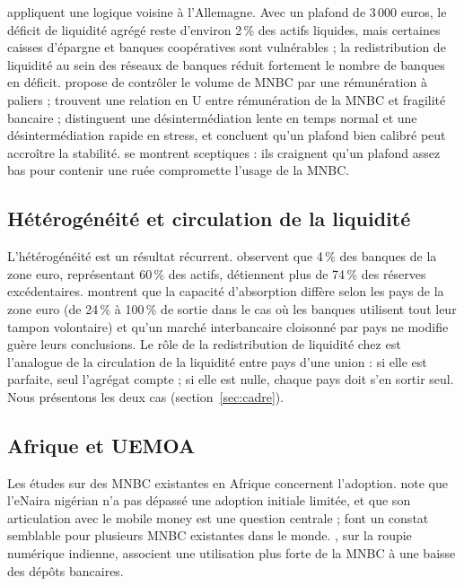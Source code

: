 \documentclass[11pt,a4paper]{article}
\begin{document}
	\citet{fritz2024} appliquent une logique voisine à l'Allemagne. Avec un plafond de 3\,000 euros, le déficit de liquidité agrégé reste d'environ 2\,\% des actifs liquides, mais certaines caisses d'épargne et banques coopératives sont vulnérables ; la redistribution de liquidité au sein des réseaux de banques réduit fortement le nombre de banques en déficit. \citet{bindseil2020} propose de contrôler le volume de MNBC par une rémunération à paliers ; \citet{ahnert2023} trouvent une relation en U entre rémunération de la MNBC et fragilité bancaire ; \citet{bidder2024} distinguent une désintermédiation lente en temps normal et une désintermédiation rapide en stress, et concluent qu'un plafond bien calibré peut accroître la stabilité. \citet{kumhof2018} se montrent sceptiques : ils craignent qu'un plafond assez bas pour contenir une ruée compromette l'usage de la MNBC.
	
	\subsection{Hétérogénéité et circulation de la liquidité}
	
	L'hétérogénéité est un résultat récurrent. \citet{adalid2022} observent que 4\,\% des banques de la zone euro, représentant 60\,\% des actifs, détiennent plus de 74\,\% des réserves excédentaires. \citet{meller2023} montrent que la capacité d'absorption diffère selon les pays de la zone euro (de 24\,\% à 100\,\% de sortie dans le cas où les banques utilisent tout leur tampon volontaire) et qu'un marché interbancaire cloisonné par pays ne modifie guère leurs conclusions. Le rôle de la redistribution de liquidité chez \citet{fritz2024} est l'analogue de la circulation de la liquidité entre pays d'une union : si elle est parfaite, seul l'agrégat compte ; si elle est nulle, chaque pays doit s'en sortir seul. Nous présentons les deux cas (section~\ref{sec:cadre}).
	
	\subsection{Afrique et UEMOA}
	
	Les études sur des MNBC existantes en Afrique concernent l'adoption. \citet{ree2023} note que l'eNaira nigérian n'a pas dépassé une adoption initiale limitée, et que son articulation avec le mobile money est une question centrale ; \citet{sun2023} font un constat semblable pour plusieurs MNBC existantes dans le monde. \citet{dimaggio2024}, sur la roupie numérique indienne, associent une utilisation plus forte de la MNBC à une baisse des dépôts bancaires.
	
\end{document}

